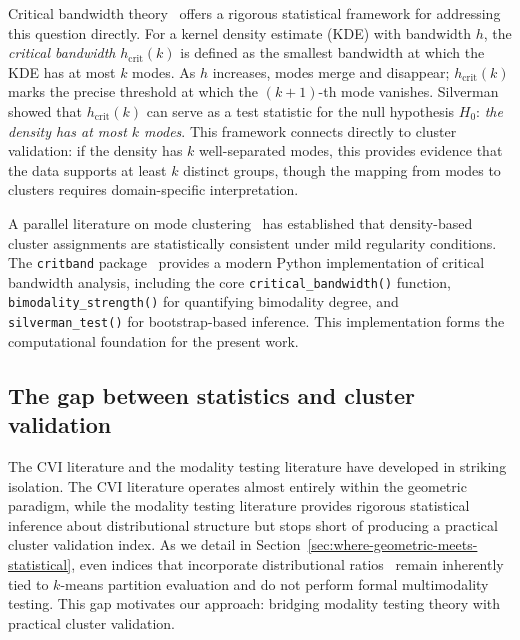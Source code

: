 \documentclass[journal]{IEEEtran}
\begin{document}
Critical bandwidth theory~\cite{silverman1981using, silverman1986density} offers a rigorous statistical framework for addressing this question directly. For a kernel density estimate (KDE) with bandwidth $h$, the \emph{critical bandwidth} $h_{\mathrm{crit}}(k)$ is defined as the smallest bandwidth at which the KDE has at most $k$ modes. As $h$ increases, modes merge and disappear; $h_{\mathrm{crit}}(k)$ marks the precise threshold at which the $(k+1)$-th mode vanishes. Silverman~\cite{silverman1981using} showed that $h_{\mathrm{crit}}(k)$ can serve as a test statistic for the null hypothesis $H_0$: \emph{the density has at most $k$ modes}. This framework connects directly to cluster validation: if the density has $k$ well-separated modes, this provides evidence that the data supports at least $k$ distinct groups, though the mapping from modes to clusters requires domain-specific interpretation.

A parallel literature on mode clustering~\cite{chacon2015population, chen2017density, chen2017mode} has established that density-based cluster assignments are statistically consistent under mild regularity conditions. The \texttt{critband} package~\cite{zhang2026critband, critband2025} provides a modern Python implementation of critical bandwidth analysis, including the core \texttt{critical\_bandwidth()} function, \texttt{bimodality\_strength()} for quantifying bimodality degree, and \texttt{silverman\_test()} for bootstrap-based inference. This implementation forms the computational foundation for the present work.

\subsection{The gap between statistics and cluster validation}
\label{sec:gap}

The CVI literature and the modality testing literature have developed in striking isolation. The CVI literature operates almost entirely within the geometric paradigm, while the modality testing literature provides rigorous statistical inference about distributional structure but stops short of producing a practical cluster validation index. As we detail in Section~\ref{sec:where-geometric-meets-statistical}, even indices that incorporate distributional ratios~\cite{hartigan1975clustering, krzanowski1988criterion, sugar2003finding} remain inherently tied to $k$-means partition evaluation and do not perform formal multimodality testing. This gap motivates our approach: bridging modality testing theory with practical cluster validation.
\end{document}
